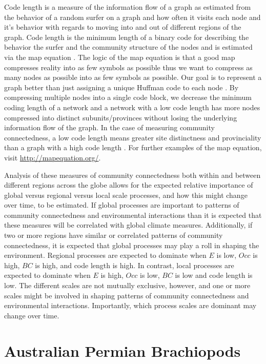\documentclass[12pt,letterpaper]{article}
\begin{document}
Code length is a measure of the information flow \citep{Shannon1948} of a graph as estimated from the behavior of a random surfer \citep{Brin1998} on a graph and how often it visits each node and it's behavior with regards to moving into and out of different regions of the graph. Code length is the minimum length of a binary code for describing the behavior the surfer and the community structure of the nodes and is estimated via the map equation \citep{Rosvall2008,Rosvall2009a}. The logic of the map equation is that a good map compresses reality into as few symbols as possible thus we want to compress as many nodes as possible into as few symbols as possible. Our goal is to represent a graph better than just assigning a unique Huffman code to each node \citep{Huffman1952,Rosvall2008}. By compressing multiple nodes into a single code block, we decrease the minimum coding length of a network and a network with a low code length has more nodes compressed into distinct subunits/provinces without losing the underlying information flow of the graph. In the case of measuring community connectedness, a low code length means greater site distinctness and provinciality than a graph with a high code length \citep{Sidor2013}. For further examples of the map equation, visit \url{http://mapequation.org/}.

Analysis of these measures of community connectedness both within and between different regions across the globe allows for the expected relative importance of global versus regional versus local scale processes, and how this might change over time, to be estimated. If global processes are important to patterns of community connectedness and environmental interactions than it is expected that these measures will be correlated with global climate measures. Additionally, if two or more regions have similar or correlated patterns of community connectedness, it is expected that global processes may play a roll in shaping the environment. Regional processes are expected to dominate when \(E\) is low, \(Occ\) is high, \(BC\) is high, and code length is high. In contrast, local processes are expected to dominate when \(E\) is high, \(Occ\) is low, \(BC\) is low and code length is low. The different scales are not mutually exclusive, however, and one or more scales might be involved in shaping patterns of community connectedness and environmental interactions. Importantly, which process scales are dominant may change over time.

\clearpage

\section{Australian Permian Brachiopods} \label{sec:brac}
\end{document}
